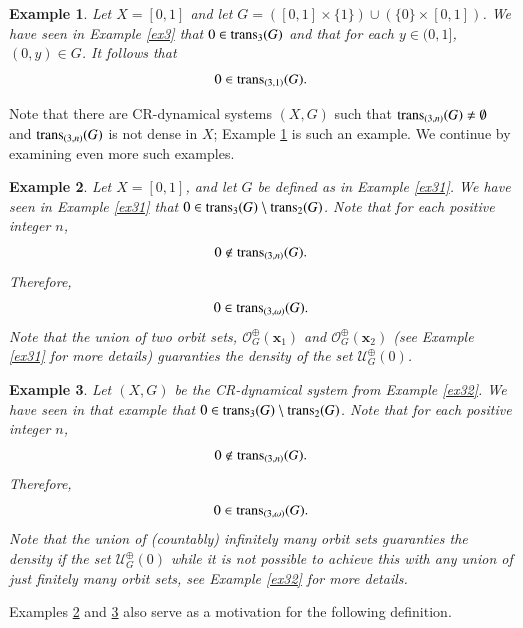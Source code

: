 \documentclass[a4paper,12pt]{article} %
\newcommand{\orbit}{\mathcal{O}^{\oplus}}
\newcommand{\orbitt}{\mathcal{U}^{\oplus}}
\newcommand{\trans}{\textup{trans}}
\newtheorem{theorem}{Theorem}[section]
\newtheorem{example}[theorem]{Example}
\begin{document}
\begin{example}\label{ex3a}
Let $X=[0,1]$ and let $G=([0,1]\times \{1\})\cup(\{0\}\times [0,1])$. 
We have seen in Example \ref{ex3} that $0\in \trans_3(G)$ and that for each $y\in (0,1]$, $(0,y)\in G$. It follows that 
$$
0\in \trans_{(3,1)}(G).
$$
\end{example}
Note that there are  CR-dynamical systems $(X,G)$ such that $\trans_{(3,n)}(G)\neq\emptyset$ and $\trans_{(3,n)}(G)$ is not dense in $X$; Example \ref{ex3a} is such an example.  
%
We continue by examining even more such examples.
\begin{example}\label{ex31a}
Let $X=[0,1]$, and let $G$ be defined as in Example \ref{ex31}.
We have seen in Example \ref{ex31} that $0\in \trans_3(G)\setminus \trans_2(G)$. Note that for each positive integer $n$, 
$$
0\not\in \trans_{(3,n)}(G).
$$
Therefore, 
$$
0\in \trans_{(3,\omega)}(G).
$$
Note that the  union of two orbit sets, $\orbit_G(\mathbf x_1)$ and $\orbit_G(\mathbf x_2)$ (see Example \ref{ex31} for more details) guaranties the density of the set $\orbitt_G(0)$.
\end{example}
\begin{example}\label{ex32a}
Let $(X,G)$ be the CR-dynamical system from Example \ref{ex32}.
We have seen in that example that  $0\in \trans_3(G)\setminus \trans_2(G)$. Note that for each positive integer $n$, 
$$
0\not\in \trans_{(3,n)}(G).
$$
Therefore, 
$$
0\in \trans_{(3,\omega)}(G).
$$
Note that the  union of (countably) infinitely many orbit sets guaranties the density if the set $\orbitt_G(0)$ while it is not possible to achieve this with any union of just finitely many orbit sets, see Example \ref{ex32} for more details.
\end{example}
Examples \ref{ex31a} and \ref{ex32a} also serve as a motivation for the following definition.
\end{document}
